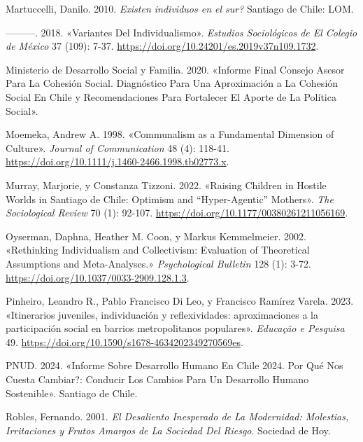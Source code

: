 \documentclass[
  letterpaper,
  DIV=11,
  numbers=noendperiod]{scrartcl}
\newlength{\cslhangindent}
\newenvironment{CSLReferences}[2] %
 {\begin{list}{}{%
  \setlength{\itemindent}{0pt}
  \setlength{\leftmargin}{0pt}
  \setlength{\parsep}{0pt}
  \ifodd #1
   \setlength{\leftmargin}{\cslhangindent}
   \setlength{\itemindent}{-1\cslhangindent}
  \fi
  \setlength{\itemsep}{#2\baselineskip}}}
 {\end{list}}
\begin{document}
\begin{CSLReferences}{1}{0}
Martuccelli, Danilo. 2010. \emph{{{\textquestiondown}Existen individuos
en el sur?}} Santiago de Chile: LOM.

---------. 2018. {«Variantes Del Individualismo»}. \emph{Estudios
Sociol{ó}gicos de El Colegio de M{é}xico} 37 (109): 7-37.
\url{https://doi.org/10.24201/es.2019v37n109.1732}.

Ministerio de Desarrollo Social y Familia. 2020. {«Informe {Final
Consejo Asesor} Para La {Cohesi{ó}n Social}. {Diagn{ó}stico} Para Una
Aproximaci{ó}n a La Cohesi{ó}n Social En {Chile} y Recomendaciones Para
Fortalecer El Aporte de La Pol{í}tica Social»}.

Moemeka, Andrew A. 1998. {«Communalism as a {Fundamental Dimension} of
{Culture}»}. \emph{Journal of Communication} 48 (4): 118-41.
\url{https://doi.org/10.1111/j.1460-2466.1998.tb02773.x}.

Murray, Marjorie, y Constanza Tizzoni. 2022. {«Raising Children in
Hostile Worlds in {Santiago} de {Chile}: {Optimism} and
{``Hyper-Agentic''} Mothers»}. \emph{The Sociological Review} 70 (1):
92-107. \url{https://doi.org/10.1177/00380261211056169}.

Oyserman, Daphna, Heather M. Coon, y Markus Kemmelmeier. 2002.
{«Rethinking Individualism and Collectivism: {Evaluation} of Theoretical
Assumptions and Meta-Analyses.»} \emph{Psychological Bulletin} 128 (1):
3-72. \url{https://doi.org/10.1037/0033-2909.128.1.3}.

Pinheiro, Leandro R., Pablo Francisco Di Leo, y Francisco Ramírez
Varela. 2023. {«{Itinerarios juveniles, individuaci{ó}n y
reflexividades: aproximaciones a la participaci{ó}n social en barrios
metropolitanos populares}»}. \emph{Educa{ç}{ã}o e Pesquisa} 49.
\url{https://doi.org/10.1590/s1678-4634202349270569es}.

PNUD. 2024. {«Informe Sobre {Desarrollo Humano} En {Chile} 2024.
{\textquestiondown}{Por} Qu{é} Nos Cuesta Cambiar?: Conducir Los Cambios
Para Un {Desarrollo Humano Sostenible}»}. Santiago de Chile.

Robles, Fernando. 2001. \emph{El Desaliento Inesperado de La Modernidad:
{Molestias}, Irritaciones y Frutos Amargos de La Sociedad Del Riesgo}.
Sociedad de Hoy.


\end{CSLReferences}
\end{document}
